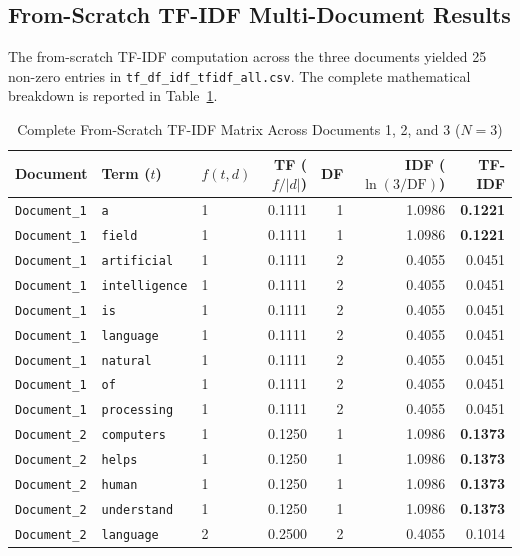 \subsection{From-Scratch TF-IDF Multi-Document Results}
The from-scratch TF-IDF computation across the three documents yielded 25 non-zero entries in \texttt{tf\_df\_idf\_tfidf\_all.csv}. The complete mathematical breakdown is reported in Table~\ref{tab:exp4_tfidf_complete}.
\begin{table}[H]
\centering
\small
\caption{Complete From-Scratch TF-IDF Matrix Across Documents 1, 2, and 3 ($N=3$)}
\label{tab:exp4_tfidf_complete}
\begin{tabularx}{\textwidth}{lllrrrr}
\toprule
\textbf{Document} & \textbf{Term ($t$)} & \textbf{$f(t, d)$} & \textbf{TF ($f/|d|$)} & \textbf{DF} & \textbf{IDF ($\ln(3/\text{DF})$)} & \textbf{TF-IDF} \\
\midrule
\texttt{Document\_1} & \texttt{a} & 1 & 0.1111 & 1 & 1.0986 & \textbf{0.1221} \\
\texttt{Document\_1} & \texttt{field} & 1 & 0.1111 & 1 & 1.0986 & \textbf{0.1221} \\
\texttt{Document\_1} & \texttt{artificial} & 1 & 0.1111 & 2 & 0.4055 & 0.0451 \\
\texttt{Document\_1} & \texttt{intelligence} & 1 & 0.1111 & 2 & 0.4055 & 0.0451 \\
\texttt{Document\_1} & \texttt{is} & 1 & 0.1111 & 2 & 0.4055 & 0.0451 \\
\texttt{Document\_1} & \texttt{language} & 1 & 0.1111 & 2 & 0.4055 & 0.0451 \\
\texttt{Document\_1} & \texttt{natural} & 1 & 0.1111 & 2 & 0.4055 & 0.0451 \\
\texttt{Document\_1} & \texttt{of} & 1 & 0.1111 & 2 & 0.4055 & 0.0451 \\
\texttt{Document\_1} & \texttt{processing} & 1 & 0.1111 & 2 & 0.4055 & 0.0451 \\
\midrule
\texttt{Document\_2} & \texttt{computers} & 1 & 0.1250 & 1 & 1.0986 & \textbf{0.1373} \\
\texttt{Document\_2} & \texttt{helps} & 1 & 0.1250 & 1 & 1.0986 & \textbf{0.1373} \\
\texttt{Document\_2} & \texttt{human} & 1 & 0.1250 & 1 & 1.0986 & \textbf{0.1373} \\
\texttt{Document\_2} & \texttt{understand} & 1 & 0.1250 & 1 & 1.0986 & \textbf{0.1373} \\
\texttt{Document\_2} & \texttt{language} & 2 & 0.2500 & 2 & 0.4055 & 0.1014 \\

\end{tabularx}
\end{table}
